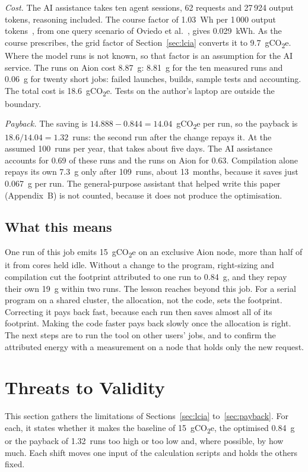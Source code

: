 \documentclass[conference,a4paper]{IEEEtran}
\begin{document}
\emph{Cost.} The AI assistance takes ten agent sessions, 62 requests and
27\,924 output tokens, reasoning included. The course factor of 1.03~Wh per
1\,000 output tokens~\cite{ries2026s8}, from one query scenario of Oviedo et
al.~\cite{oviedo2026}, gives 0.029~kWh. As the course prescribes, the grid
factor of Section~\ref{sec:lcia} converts it to 9.7~gCO\textsubscript{2}e. Where
the model runs is not known, so that factor is an assumption for the AI service.
The runs on Aion cost 8.87~g: 8.81~g for the ten measured runs and 0.06~g for
twenty short jobs: failed launches, builds, sample tests and accounting. The total cost is
18.6~gCO\textsubscript{2}e. Tests on the author's laptop are outside the
boundary.

\emph{Payback.} The saving is $14.888-0.844=14.04$~gCO\textsubscript{2}e per
run, so the payback is $18.6/14.04=1.32$~runs: the second run after the change
repays it. At the assumed 100~runs per year, that takes about five days. The AI
assistance accounts for 0.69 of these runs and the runs on Aion for 0.63.
Compilation alone repays its own 7.3~g only after 109~runs, about 13~months,
because it saves just 0.067~g per run. The general-purpose assistant that helped
write this paper (Appendix~B) is not counted, because it does not produce the
optimisation.

\subsection{What this means}
One run of this job emits 15~gCO\textsubscript{2}e on an exclusive Aion node,
more than half of it from cores held idle. Without a change to the program,
right-sizing and compilation cut the footprint attributed to one run to
0.84~g, and they repay their own 19~g within two runs. The lesson reaches
beyond this job. For a serial program on a shared cluster, the allocation, not
the code, sets the footprint. Correcting it pays back fast, because each run
then saves almost all of its footprint. Making the code faster pays back slowly
once the allocation is right. The next steps are to run the tool on other users'
jobs, and to confirm the attributed energy with a measurement on a node that
holds only the new request.

\section{Threats to Validity}\label{sec:threats}
This section gathers the limitations of Sections~\ref{sec:lcia}
to~\ref{sec:payback}. For each, it states whether it makes the baseline of
15~gCO\textsubscript{2}e, the optimised 0.84~g or the payback of 1.32~runs too
high or too low and, where possible, by how much. Each shift moves one input of
the calculation scripts and holds the others fixed.
\end{document}
